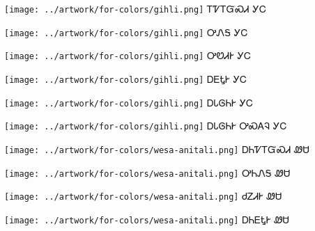 \documentclass[avery5371]{flashcards}%
\begin{document}
\begin{flashcard}{
\texttt{[image: ../artwork/for-colors/gihli.png]}
}
\Huge ᎢᏤᎢᏳᏍᏗ ᎩᏟ
\end{flashcard}

\begin{flashcard}{
\texttt{[image: ../artwork/for-colors/gihli.png]}
}
\Huge ᎤᏁᎦ ᎩᏟ
\end{flashcard}

\begin{flashcard}{
\texttt{[image: ../artwork/for-colors/gihli.png]}
}
\Huge ᎤᏬᏗᎨ ᎩᏟ
\end{flashcard}

\begin{flashcard}{
\texttt{[image: ../artwork/for-colors/gihli.png]}
}
\Huge ᎠᎬᎿᎨ ᎩᏟ
\end{flashcard}

\begin{flashcard}{
\texttt{[image: ../artwork/for-colors/gihli.png]}
}
\Huge ᎠᏓᎶᏂᎨ ᎩᏟ
\end{flashcard}

\begin{flashcard}{
\texttt{[image: ../artwork/for-colors/gihli.png]}
}
\Huge ᎠᏓᎶᏂᎨ ᎤᏍᎪᎸ ᎩᏟ
\end{flashcard}

\begin{flashcard}{
\texttt{[image: ../artwork/for-colors/wesa-anitali.png]}
}
\Huge ᎠᏂᏤᎢᏳᏍᏗ ᏪᏌ
\end{flashcard}

\begin{flashcard}{
\texttt{[image: ../artwork/for-colors/wesa-anitali.png]}
}
\Huge ᎤᏂᏁᎦ ᏪᏌ
\end{flashcard}

\begin{flashcard}{
\texttt{[image: ../artwork/for-colors/wesa-anitali.png]}
}
\Huge ᏧᏃᏗᎨ ᏪᏌ
\end{flashcard}

\begin{flashcard}{
\texttt{[image: ../artwork/for-colors/wesa-anitali.png]}
}
\Huge ᎠᏂᎬᎿᎨ ᏪᏌ
\end{flashcard}
\end{document}
